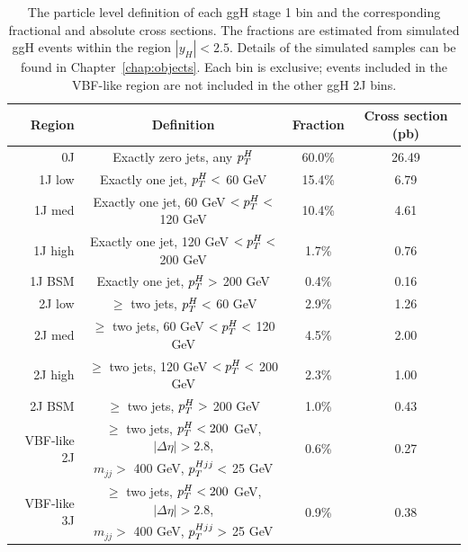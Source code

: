 \begin{table}
  \begin{centering}
    \begin{tabular}{ r | c | c | c } 
    \hline
    Region & Definition & Fraction & Cross section (pb) \\ 
    \hline
    0J          & Exactly zero jets, any $p_T^H$               & 60.0\% & 26.49 \\ 
    \hline
    1J low      & Exactly one jet, $p_T^H <$ 60 GeV            & 15.4\% & 6.79  \\
    \hline
    1J med      & Exactly one jet, 60 GeV $< p_T^H <$ 120 GeV  & 10.4\% & 4.61  \\ 
    \hline
    1J high     & Exactly one jet, 120 GeV $< p_T^H <$ 200 GeV & 1.7\% & 0.76   \\
    \hline
    1J BSM      & Exactly one jet, $p_T^H >$ 200 GeV           & 0.4\% & 0.16   \\ 
    \hline
    2J low      & $\ge$ two jets, $p_T^H <$ 60 GeV             & 2.9\% & 1.26   \\
    \hline
    2J med      & $\ge$ two jets, 60 GeV $< p_T^H <$ 120 GeV   & 4.5\% & 2.00   \\ 
    \hline
    2J high     & $\ge$ two jets, 120 GeV $< p_T^H <$ 200 GeV  & 2.3\% & 1.00   \\
    \hline
    2J BSM      & $\ge$ two jets, $p_T^H >$ 200 GeV            & 1.0\% & 0.43   \\ 
    \hline
    \multirow{2}{*}{VBF-like 2J} & $\ge$ two jets, $p_T^H < 200$ GeV, $|\Delta\eta| > 2.8$, & \multirow{2}{*}{0.6\%} & \multirow{2}{*}{0.27} \\ 
                                 & $m_{jj} >$ 400 GeV, $p_T^{Hjj} <$ 25 GeV &                        &                       \\ 
    \hline
    \multirow{2}{*}{VBF-like 3J} & $\ge$ two jets, $p_T^H < 200$ GeV, $|\Delta\eta| > 2.8$, & \multirow{2}{*}{0.9\%} & \multirow{2}{*}{0.38} \\ 
                                 & $m_{jj} >$ 400 GeV, $p_T^{Hjj} >$ 25 GeV &                        &                       \\ 
    \hline
    \end{tabular}
    \caption{The particle level definition of each ggH stage 1 bin 
    and the corresponding fractional and absolute cross sections.
    The fractions are estimated from simulated ggH \Hgg events 
    within the region $|y_H| < 2.5$.
    Details of the simulated samples can be found in Chapter~\ref{chap:objects}.
    Each bin is exclusive; 
    events included in the VBF-like region are not included in the other ggH 2J bins.
    }
    \label{tab:cat_ggHfractions}
  \end{centering}
\end{table}

